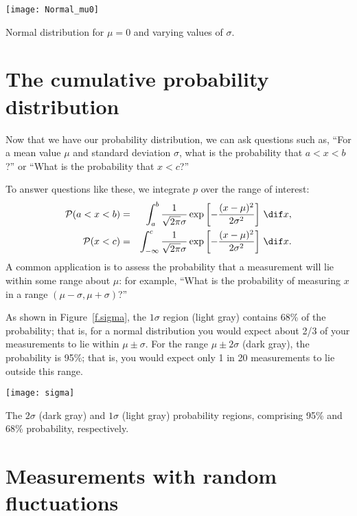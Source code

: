 \begin{marginfigure}
\texttt{[image: Normal\_mu0]}
\caption[Normal distributions with different standard deviations]{Normal distribution for $\mu=0$ and varying values of $\sigma$.}
\label{f.Normal-vary-sigma}
\end{marginfigure}

\section{The cumulative probability distribution}

Now that we have our probability distribution, we can ask questions such as, ``For a mean value $\mu$ and standard deviation $\sigma$, what is the probability that $a < x < b$?'' or ``What is the probability that $x < c$?''

To answer questions like these, we integrate $p$ over the range of interest:
\begin{eqnarray*}
	\prob(a< x < b) &=& \int_{a}^{b} \frac{1}{\sqrt{2\pi}\sigma}\exp\left[-\frac{(x-\mu)^{2}}{2\sigma^{2}}\right]\,\dif x,\\
	\prob(x < c) &=& \int_{-\infty}^{c} \frac{1}{\sqrt{2\pi}\sigma}\exp\left[-\frac{(x-\mu)^{2}}{2\sigma^{2}}\right]\,\dif x.
\end{eqnarray*}
A common application is to assess the probability that a measurement will lie within some range about $\mu$: for example, ``What is the probability of measuring $x$ in a range $(\mu-\sigma,\mu+\sigma)$?'' 

As shown in Figure~\ref{f.sigma}, the $1\sigma$ region (light gray) contains 68\% of the probability; that is, for a normal distribution you would expect about 2/3 of your measurements to lie within $\mu \pm \sigma$.  For the range $\mu \pm 2\sigma$ (dark gray), the probability is 95\%; that is, you would expect only 1 in 20 measurements to lie outside this range.

\begin{marginfigure}
\texttt{[image: sigma]}
\caption[Proability regions for one and two standard deviations]{The $2\sigma$ (dark gray) and $1\sigma$ (light gray) probability regions, comprising 95\% and 68\% probability, respectively.}
\label{f.sigma}
\end{marginfigure}


\section{Measurements with random fluctuations}

